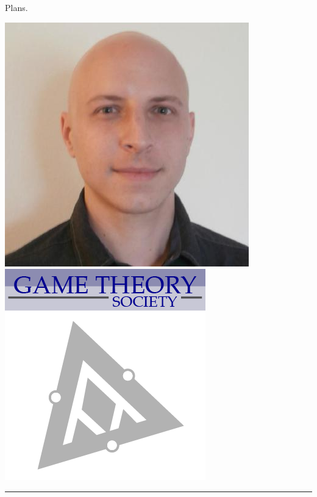 \documentclass{beamer}
\begin{document}
\begin{frame}{Plans.}
\begin{center}
        \includegraphics[height=0.15\textheight]{static/marc.jpeg}
        \hspace{3cm}
        \includegraphics[height=0.2\textheight]{static/game-society.png}

        \rule{\textwidth}{2pt}
        \vspace{5pt}


\end{center}
\end{frame}
\end{document}

